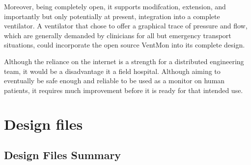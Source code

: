 \documentclass[11pt, letterpaper]{article}
\begin{document}
Moreover, being completely open, it supports modifcation, extension, and importantly but only potentially at present, integration into a complete ventilator. A ventilator that chose to offer a graphical trace of pressure and flow, which are generally demanded by clinicians for all but emergency transport situations, could incorporate the open source VentMon into its complete design.

Although the reliance on the internet is a strength for a distributed engineering team,
it would be a disadvantage it a field hospital.
Although aiming to eventually be safe enough and reliable to be used as a monitor on human patients,
it requires much improvement before it is ready for that intended use.

\section{Design files}

\subsection{Design Files Summary}
\end{document}
